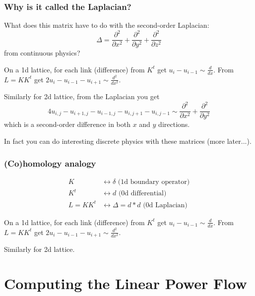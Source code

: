 \documentclass[10pt,aspectratio=169,dvipsnames]{beamer}
\begin{document}
\begin{frame}
\frametitle{Why is it called the Laplacian?}

What does this matrix have to do with the second-order Laplacian:
\begin{equation}
  \Delta = \frac{\partial^2}{\partial x^2} + \frac{\partial^2}{\partial y^2} + \frac{\partial^2}{\partial z^2}
\end{equation}
from continuous physics?

On a 1d lattice, for each link (difference) from $K^t$ get $u_i - u_{i-1} \sim \frac{d}{dx}$.
 From $L = KK^t$ get $2u_i - u_{i-1} - u_{i+1} \sim \frac{d^2}{dx^2}$.

Similarly for 2d lattice, from the Laplacian you get
\begin{equation}
  4u_{i,j} - u_{i+1,j} - u_{i-1,j} - u_{i,j+1} - u_{i,j-1}  \sim \frac{\partial^2}{\partial x^2} + \frac{\partial^2}{\partial y^2}
\end{equation}
which is a second-order difference in both $x$ and $y$ directions.

In fact you can do interesting discrete physics with these matrices
(more later...).



\end{frame}



\begin{frame}
  \frametitle{(Co)homology analogy}


  \begin{align*}
    K  & \leftrightarrow  \delta \textrm{ (1d boundary operator)} \\
    K^t  & \leftrightarrow  d \textrm{ (0d differential)} \\
   L = KK^t & \leftrightarrow \Delta = d*d \textrm{ (0d Laplacian)}
  \end{align*}


  On a 1d lattice, for each link (difference) from $K^t$ get $u_i - u_{i-1} \sim \frac{d}{dx}$.
  From $L = KK^t$ get $2u_i - u_{i-1} - u_{i+1} \sim \frac{d^2}{dx^2}$.

  Similarly for 2d lattice.
\end{frame}




\section{Computing the Linear Power Flow}
\end{document}
